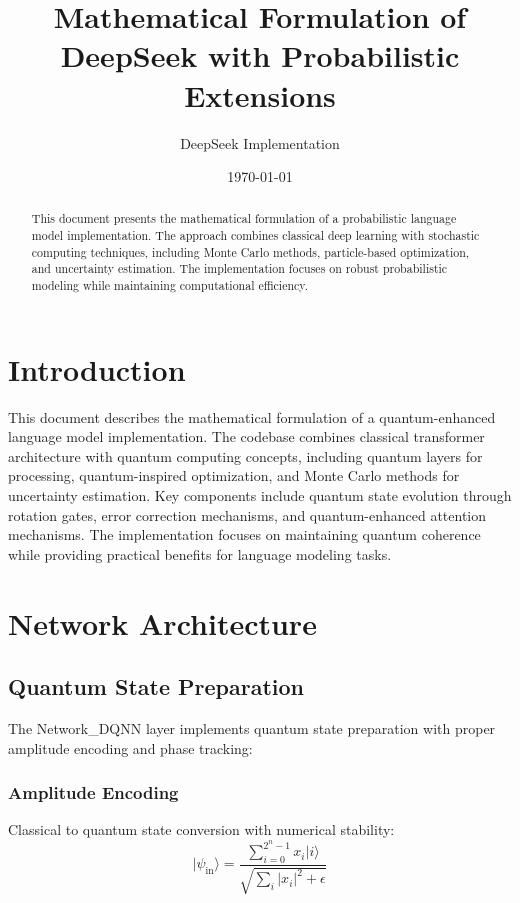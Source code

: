 \documentclass{article}
\title{Mathematical Formulation of DeepSeek with Probabilistic Extensions}
\author{DeepSeek Implementation}
\date{\today}
\begin{document}
\maketitle

\begin{abstract}
This document presents the mathematical formulation of a probabilistic language model implementation. The approach combines classical deep learning with stochastic computing techniques, including Monte Carlo methods, particle-based optimization, and uncertainty estimation. The implementation focuses on robust probabilistic modeling while maintaining computational efficiency.
\end{abstract}

\section*{Introduction}
This document describes the mathematical formulation of a quantum-enhanced language model implementation. The codebase combines classical transformer architecture with quantum computing concepts, including quantum layers for processing, quantum-inspired optimization, and Monte Carlo methods for uncertainty estimation. Key components include quantum state evolution through rotation gates, error correction mechanisms, and quantum-enhanced attention mechanisms. The implementation focuses on maintaining quantum coherence while providing practical benefits for language modeling tasks.

\section{Network Architecture}

\subsection{Quantum State Preparation}
The Network_DQNN layer implements quantum state preparation with proper amplitude encoding and phase tracking:

\subsubsection{Amplitude Encoding}
Classical to quantum state conversion with numerical stability:
\begin{equation}
|\psi_{\text{in}}\rangle = \frac{\sum_{i=0}^{2^n-1} x_i|i\rangle}{\sqrt{\sum_i |x_i|^2 + \epsilon}}
\end{equation}
\end{document}
